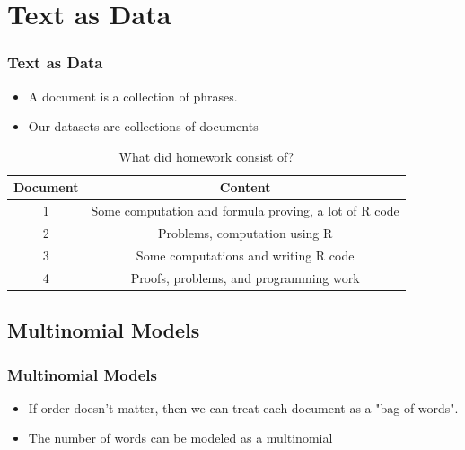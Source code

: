 \documentclass{beamer}
\begin{document}
\section{Text as Data }
\begin{frame}
 \frametitle{Text as Data}
 \begin{itemize}
\pause
\item A document is a collection of phrases. 
\pause
\item Our datasets are collections of documents
\end{itemize}
\pause
\begin{table}[!hbpt]
\caption{What did homework consist of?} \label{tab:title}
\pause
\begin{center}
\begin{tabular} {c c}
\textbf{Document} & \textbf{Content} \\
\hline
1 & Some computation and formula proving, a lot of R code \\
2 & Problems, computation using R \\
3 & Some computations and writing R code\\
4 & Proofs, problems, and programming work \\
\end{tabular}
\end{center}
\end{table}
\end{frame}

\subsection[Basic Structure]{Multinomial Models}
\begin{frame}
\pause
\frametitle{Multinomial Models}
\begin{itemize}
\item If order doesn't matter, then we can treat each document as a "bag of words". 
\pause
\item The number of words can be modeled as a multinomial 
\pause
\end{itemize}
\begin{table}[!hbpt]
\caption{Creating a word-count matrix from text}
\begin{center}
\end{center}
\end{table} 
\pause
\end{frame}
\end{document}
